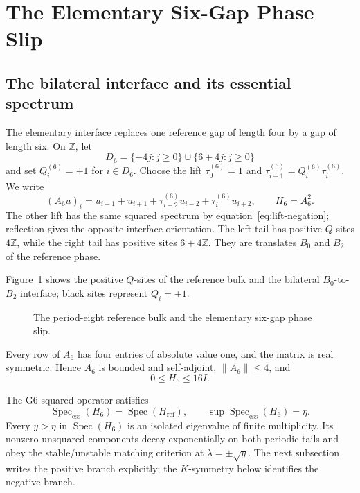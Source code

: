\section{The Elementary Six-Gap Phase Slip}
\label{sec:elementary-g6}

\subsection{The bilateral interface and its essential spectrum}
\label{subsec:bilateral-interface-essential-spectrum}

The elementary interface replaces one reference gap of length four by a gap
of length six.  On \(\mathbb Z\), let
\[
D_6=\{-4j:j\geq0\}\cup\{6+4j:j\geq0\}
\]
and set \(Q_i^{(6)}=+1\) for \(i\in D_6\). Choose the lift
\(\tau_0^{(6)}=1\) and
\(\tau_{i+1}^{(6)}=Q_i^{(6)}\tau_i^{(6)}\).  We write
\[
(A_6u)_i=u_{i-1}+u_{i+1}
+\tau_{i-2}^{(6)}u_{i-2}+\tau_i^{(6)}u_{i+2},
\qquad H_6=A_6^2.
\]
The other lift has the same squared spectrum by
equation~\eqref{eq:lift-negation}; reflection gives the opposite interface
orientation.  The left tail has positive \(Q\)-sites \(4\mathbb Z\), while
the right tail has positive sites \(6+4\mathbb Z\).  They are translates
\(B_0\) and \(B_2\) of the reference phase.

Figure~\ref{fig:reference-g6} shows the positive \(Q\)-sites of the reference
bulk and the bilateral \(B_0\)-to-\(B_2\) interface; black sites represent
\(Q_i=+1\).
\begin{figure}[t]
\centering

\caption{The period-eight reference bulk and the elementary six-gap phase
slip.}
\label{fig:reference-g6}
\end{figure}

Every row of \(A_6\) has four entries of absolute value one, and the matrix is
real symmetric.  Hence \(A_6\) is bounded and self-adjoint,
\(\|A_6\|\leq4\), and
\[
0\leq H_6\leq16I.
\]

\begin{lemma}
\label{lem:g6-essential}
The G6 squared operator satisfies
\[
\operatorname{Spec}_{\mathrm{ess}}(H_6)
=\operatorname{Spec}(H_{\mathrm{ref}}),
\qquad
\sup\operatorname{Spec}_{\mathrm{ess}}(H_6)=\eta.
\]
Every \(y>\eta\) in \(\operatorname{Spec}(H_6)\) is an isolated eigenvalue
of finite multiplicity.  Its nonzero unsquared components decay
exponentially on both periodic tails and obey the stable/unstable matching
criterion at \(\lambda=\pm\sqrt y\).  The next subsection writes the positive
branch explicitly; the \(K\)-symmetry below identifies the negative branch.
\end{lemma}


